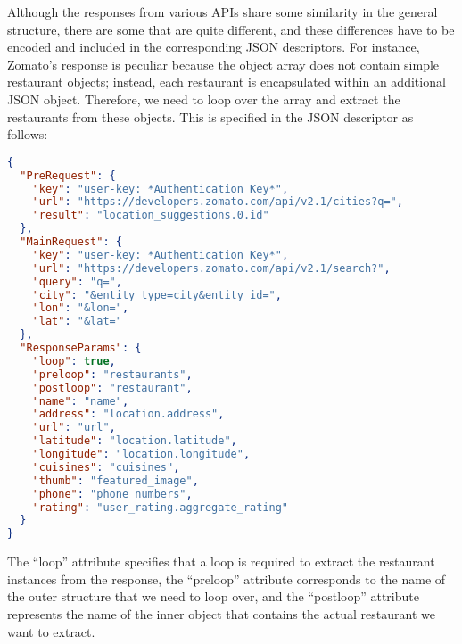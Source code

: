 Although the responses from various APIs share some similarity in the general structure, there are some that are quite different, and these differences have to be encoded and included in the corresponding JSON descriptors. For instance, Zomato's response is peculiar because the object array does not contain simple restaurant objects; instead, each restaurant is encapsulated within an additional JSON object. Therefore, we need to loop over the array and extract the restaurants from these objects. This is specified in the JSON descriptor as follows:
\begin{lstlisting}[language=json,firstnumber=1]
{
  "PreRequest": {
    "key": "user-key: *Authentication Key*",
    "url": "https://developers.zomato.com/api/v2.1/cities?q=",
    "result": "location_suggestions.0.id"
  },
  "MainRequest": {
    "key": "user-key: *Authentication Key*",
    "url": "https://developers.zomato.com/api/v2.1/search?",
    "query": "q=",
    "city": "&entity_type=city&entity_id=",
    "lon": "&lon=",
    "lat": "&lat="
  },
  "ResponseParams": {
    "loop": true,
    "preloop": "restaurants",
    "postloop": "restaurant",
    "name": "name",
    "address": "location.address",
    "url": "url",
    "latitude": "location.latitude",
    "longitude": "location.longitude",
    "cuisines": "cuisines",
    "thumb": "featured_image",
    "phone": "phone_numbers",
    "rating": "user_rating.aggregate_rating"
  }
}
\end{lstlisting}
The ``loop'' attribute specifies that a loop is required to extract the restaurant instances from the response, the ``preloop'' attribute corresponds to the name of the outer structure that we need to loop over, and the ``postloop'' attribute represents the name of the inner object that contains the actual restaurant we want to extract.
